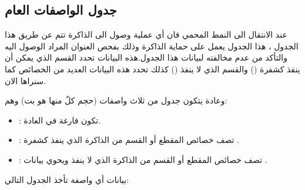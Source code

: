 \documentclass[document.tex]{subfiles}
\begin{document}
\subsection{جدول الواصفات العام }
\label{sec:gdt}
عند الانتقال الى النمط المحمي  فان أي عملية وصول الى الذاكرة تتم عن طريق هذا الجدول  ، هذا الجدول يعمل على حماية الذاكرة وذلك بفحص العنوان المراد الوصول اليه والتأكد من عدم مخالفته لبيانات هذا الجدول.هذه البيانات تحدد القسم الذي يمكن أن ينفذ كشفرة () والقسم الذي لا ينفذ () كذلك تحدد هذه البيانات العديد من الخصائص كما سنراها الان.

وعادة يتكون جدول  من ثلاث واصفات  (حجم كلٌ منها هو  بت) وهم:
\begin{itemize}
\item {}: تكون فارغة في العادة.
\item {}: تصف خصائص المقطع  أو القسم من الذاكرة الذي ينفذ كشفرة .
\item {}: تصف خصائص المقطع أو القسم من الذاكرة الذي لا ينفذ ويحوي بيانات .
\end{itemize}
بيانات أي واصفة  تأخذ الجدول التالي:
\end{document}
